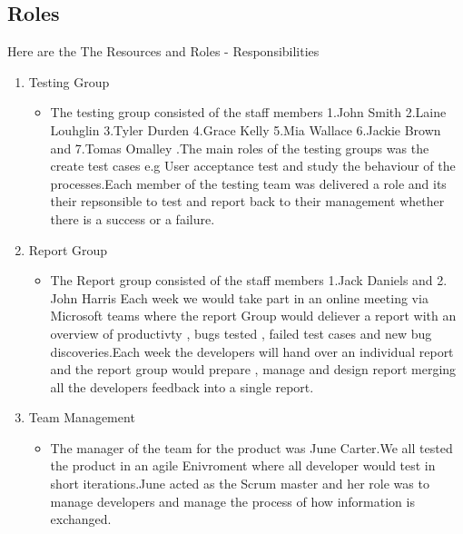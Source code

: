 

\subsection{Roles}

Here are the The Resources and Roles - Responsibilities

\begin{enumerate}
 
 
\item Testing Group
   \begin{itemize}
     \item The testing group consisted of the staff members 1.John Smith 2.Laine Louhglin
     3.Tyler Durden 4.Grace Kelly 5.Mia Wallace 6.Jackie Brown and 7.Tomas Omalley
     .The main roles of the testing groups was the create test cases e.g User acceptance test and study the behaviour of the processes.Each member of the testing team was delivered a role and its their repsonsible to test and report back to their management whether there is a success or a failure.
   \end{itemize}






\item Report Group
   \begin{itemize}
     \item The Report group consisted of  the staff members 1.Jack Daniels and 2. John  Harris Each week we would take part in an online meeting via Microsoft teams where the report Group would deliever a report with an overview of productivty , bugs tested , failed test cases and new bug discoveries.Each week the developers will hand over an individual report and  the report group would prepare , manage and design report merging all the developers feedback into a single report.
   \end{itemize}


\item Team Management
   \begin{itemize}
     \item The manager of the team for the product was June Carter.We all tested the product in an agile Enivroment where all developer would test in short iterations.June acted as the Scrum master and her role was to manage developers and manage the process of how information is exchanged.
   \end{itemize}


   
\end{enumerate}


  